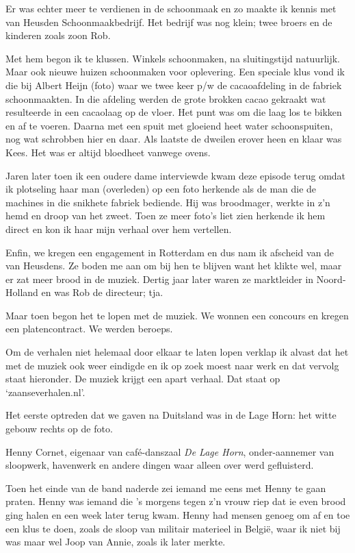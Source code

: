 \documentclass[10pt,twoside,openright]{memoir}
\begin{document}
Er was echter meer te verdienen in de schoonmaak en zo maakte ik kennis met van Heusden Schoonmaakbedrijf. Het bedrijf was nog klein; twee broers en de kinderen zoals zoon Rob. 

Met hem begon ik te klussen. Winkels schoonmaken, na sluitingstijd natuurlijk. Maar ook nieuwe huizen schoonmaken voor oplevering. Een speciale klus vond ik die bij Albert Heijn (foto) waar we twee keer p/w de cacaoafdeling in de fabriek schoonmaakten. In die afdeling werden de grote brokken cacao gekraakt wat resulteerde in een cacaolaag op de vloer. Het punt was om die laag los te bikken en af te voeren. Daarna met een spuit met gloeiend heet water schoonspuiten, nog wat schrobben hier en daar. Als laatste de dweilen erover heen en klaar was Kees. Het was er altijd bloedheet vanwege ovens. 

Jaren later toen ik een oudere dame interviewde kwam deze episode terug omdat ik plotseling haar man (overleden) op een foto herkende als de man die de machines in die snikhete fabriek bediende. Hij was broodmager, werkte in z’n hemd en droop van het zweet. Toen ze meer foto’s liet zien herkende ik hem direct en kon ik haar mijn verhaal over hem vertellen.

Enfin, we kregen een engagement in Rotterdam en dus nam ik afscheid van de van Heusdens. Ze boden me aan om bij hen te blijven want het klikte wel, maar er zat meer brood in de muziek. Dertig jaar later waren ze marktleider in Noord-Holland en was Rob de directeur; tja.

Maar toen begon het te lopen met de muziek. We wonnen een concours en kregen een platencontract. We werden beroeps. 

Om de verhalen niet helemaal door elkaar te laten lopen verklap ik alvast dat het met de muziek ook weer eindigde en ik op zoek moest naar werk en dat vervolg staat hieronder. De muziek krijgt een apart verhaal. Dat staat op ‘zaanseverhalen.nl’.

Het eerste optreden dat we gaven na Duitsland was in de Lage Horn: het witte gebouw rechts op de foto. 

Henny Cornet, eigenaar van café-danszaal \emph{De Lage Horn}, onder-aannemer van sloopwerk, havenwerk en andere dingen waar alleen over werd gefluisterd. 

Toen het einde van de band naderde zei iemand me eens met Henny te gaan praten. Henny was iemand die ’s morgens tegen z’n vrouw riep dat ie even brood ging halen en een week later terug kwam. Henny had mensen genoeg om af en toe een klus te doen, zoals de sloop van militair materieel in België, waar ik niet bij was maar wel Joop van Annie, zoals ik later merkte. 
\end{document}
